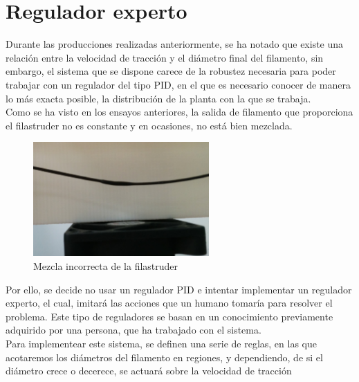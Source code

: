 \section{Regulador experto}
\label{sec:reg_expt}

Durante las producciones realizadas anteriormente, se ha notado que existe una relación entre la velocidad de tracción y el diámetro final del filamento, sin embargo, el sistema que se dispone carece de la robustez necesaria para poder trabajar con un regulador del tipo PID, en el que es necesario conocer de manera lo más exacta posible, la distribución de la planta con la que se trabaja.\\

Como se ha visto en los ensayos anteriores, la salida de filamento que proporciona el filastruder no es constante y en ocasiones, no está bien mezclada.

\begin{figure}[H]
    \centering
    \includegraphics[width=0.6\textwidth]{images/producciones/22072015/IMG_20150722_120959.jpg}
    \caption{Mezcla incorrecta de la filastruder}
    \label{fig:reg_mezcla}
\end{figure}

Por ello, se decide no usar un regulador PID e intentar implementar un regulador experto, el cual, imitará las acciones que un humano tomaría para resolver el problema. Este tipo de reguladores se basan en un conocimiento previamente adquirido por una persona, que ha trabajado con el sistema.\\

Para implementear este sistema, se definen una serie de reglas, en las que acotaremos los diámetros del filamento en regiones, y dependiendo, de si el diámetro crece o decerece, se actuará sobre la velocidad de tracción